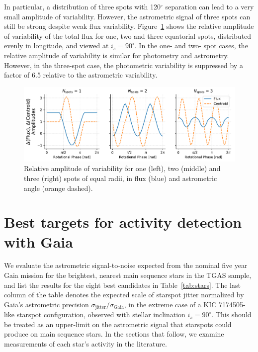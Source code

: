 In particular, a distribution of three spots with 120$^\circ$ separation
can lead to a very small amplitude of variability.  However, the
astrometric signal of three spots can still be strong despite weak
flux variability. Figure~\ref{fig:photo_vs_astro} shows the relative 
amplitude of variability of the total flux for one, two and three equatorial
spots, distributed evenly in longitude, and viewed at $i_s = 90^\circ$.  In the one- and two- spot cases, the relative
amplitude of variability is similar for photometry and astrometry.
However, in the three-spot case, the photometric variability is
suppressed by a factor of 6.5 relative to the astrometric variability.

\begin{figure}
    \centering
    \includegraphics[scale=0.38]{gaia/n_spots.pdf}
    \caption{Relative amplitude of variability for one (left),
    two (middle) and three (right) spots of equal radii, in flux (blue)
    and astrometric angle (orange dashed).}
    \label{fig:photo_vs_astro}
\end{figure}

\section{Best targets for activity detection with Gaia} \label{sec:targets}

We evaluate the astrometric signal-to-noise expected from the nominal five year Gaia mission for the brightest, nearest main sequence stars in the TGAS sample, and list the results for the eight best candidates in Table~\ref{tab:stars}. The last column of the table denotes the expected scale of starspot jitter normalized by Gaia's astrometric precision $\sigma_{\mathrm{jitter}}/\sigma_{\mathrm{Gaia}}$, in the extreme case of a KIC 7174505-like starspot configuration, observed with stellar inclination $i_s = 90^\circ$. This should be treated as an upper-limit on the astrometric signal that starspots could produce on main sequence stars. In the sections that follow, we examine measurements of each star's activity in the literature.

